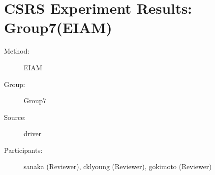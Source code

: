 \chapter {CSRS Experiment Results: Group7(EIAM)}	  
\small

\begin{description}
\item [Method:] EIAM
\item [Group:] Group7
\item [Source:] driver
\item [Participants:] sanaka (Reviewer), cklyoung (Reviewer), gokimoto (Reviewer)
\end{description}
